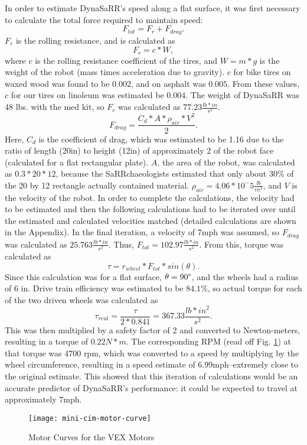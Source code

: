 In order to estimate DynaSaRR's speed along a flat surface, it was first necessary to calculate the total force required to maintain speed:
$$F_{tot} = F_r + F_{drag}.$$
$F_r$ is the rolling resistance, and is calculated as $$F_r = c*W,$$ where $c$ is the rolling resistance coefficient of the tires, and $W = m*g$ is the weight of the robot (mass times acceleration due to gravity). $c$ for bike tires on waxed wood was found to be $0.002$, and on asphalt was $0.005$. From these values, $c$ for our tires on linoleum was estimated be $0.004$. The weight of DynaSaRR was 48 lbs. with the med kit, so $F_r$ was calculated as $77.23\frac{lb*in}{s^2}$.
$$ F_{drag} = \frac{C_d*A* \rho_{air}*V^2}{2}.$$
Here, $C_d$ is the coefficient of drag, which was estimated to be 1.16 due to the ratio of length (20in) to height (12in) of approximately 2 of the robot face (calculated for a flat rectangular plate). $A$, the area of the robot, was calculated as $0.3*20*12$, because the SaRRchaeologists estimated that only about $30 \%$ of the 20 by 12 rectangle actually contained material. $\rho_{air} = 4.06*10^-5 \frac{lb}{in^3}$, and $V$ is the velocity of the robot. In order to complete the calculations, the velocity had to be estimated and then the following calculations had to be iterated over until the estimated and calculated velocities matched (detailed calculations are shown in the Appendix). In the final iteration, a velocity of 7mph was assumed, so $F_{drag}$ was calculated as $25.763 \frac{lb*in}{s^2}$. Thus, $F_{tot} = 102.97 \frac{lb*in}{s^2}$. From this, torque was calculated as 
$$ \tau = r_{wheel}*F_{tot}*sin( \theta).$$
Since this calculation was for a flat surface, $\theta = 90 \degree $, and the wheels had a radius of 6 in. Drive train efficiency was estimated to be $84.1 \%$, so actual torque for each of the two driven wheels was calculated as
$$ \tau_{real} = \frac{\tau}{2*0.841} = 367.33 \frac{lb*in^2}{s^2}.$$
This was then multiplied by a safety factor of 2 and converted to Newton-meters, resulting in a torque of $0.22 N*m$. The corresponding RPM (read off Fig. \ref{fig:motorcurve}) at that torque was 4700 rpm, which was converted to a speed by multiplying by the wheel circumference, resulting in a speed estimate of 6.99mph--extremely close to the original estimate. This showed that this iteration of calculations would be an accurate predictor of DynaSaRR's performance: it could be expected to travel at approximately 7mph.

\begin{figure}[ht]
    \centering
    \texttt{[image: mini-cim-motor-curve]}
    \caption{Motor Curves for the VEX Motors}
    \label{fig:motorcurve}
\end{figure}

